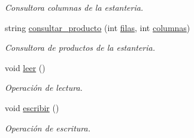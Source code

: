 \begin{DoxyCompactItemize}
\begin{DoxyCompactList}\small\item\em Consultora columnas de la estanteria. \end{DoxyCompactList}\item 
string \hyperlink{class_sala_a501152378be12f553ca079283d46c5dc}{consultar\+\_\+producto} (int \hyperlink{class_sala_a4cccb03763eea3ebd6d192491b25f7dc}{filas}, int \hyperlink{class_sala_af3c278931f26e28e77fa363e9be82000}{columnas})
\begin{DoxyCompactList}\small\item\em Consultora de productos de la estanteria. \end{DoxyCompactList}\item 
void \hyperlink{class_sala_abbb0194559de617baeed1e4b444ed2b2}{leer} ()
\begin{DoxyCompactList}\small\item\em Operación de lectura. \end{DoxyCompactList}\item 
void \hyperlink{class_sala_afd8421dde833322ed676c232e88cb77c}{escribir} ()
\begin{DoxyCompactList}\small\item\em Operación de escritura. \end{DoxyCompactList}\end{DoxyCompactItemize}
